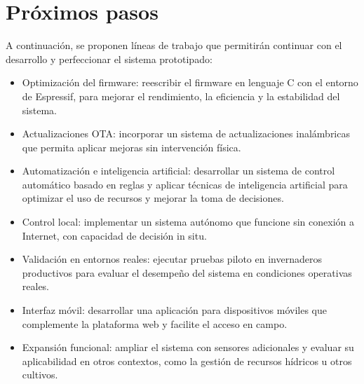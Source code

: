 \section{Próximos pasos}

A continuación, se proponen líneas de trabajo que permitirán continuar con el
desarrollo y perfeccionar el sistema prototipado:

\begin{itemize}
    \item Optimización del firmware: reescribir el firmware en lenguaje C con el entorno
          de Espressif, para mejorar el rendimiento, la eficiencia y la estabilidad del
          sistema.

    \item Actualizaciones OTA: incorporar un sistema de actualizaciones inalámbricas que
          permita aplicar mejoras sin intervención física.

    \item Automatización e inteligencia artificial: desarrollar un sistema de control
          automático basado en reglas y aplicar técnicas de inteligencia artificial para
          optimizar el uso de recursos y mejorar la toma de decisiones.

    \item Control local: implementar un sistema autónomo que funcione sin conexión a
          Internet, con capacidad de decisión in situ.

    \item Validación en entornos reales: ejecutar pruebas piloto en invernaderos
          productivos para evaluar el desempeño del sistema en condiciones operativas
          reales.

    \item Interfaz móvil: desarrollar una aplicación para dispositivos móviles que
          complemente la plataforma web y facilite el acceso en campo.

    \item Expansión funcional: ampliar el sistema con sensores adicionales y evaluar su
          aplicabilidad en otros contextos, como la gestión de recursos hídricos u otros
          cultivos.
\end{itemize}

